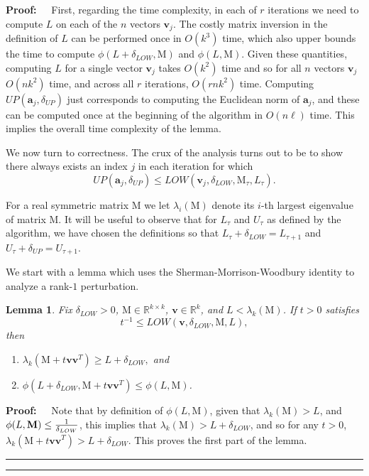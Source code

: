 \documentclass[11pt]{article}
\newtheorem{lemma}[theorem]{Lemma}
\newenvironment{proof}{\begin{trivlist} \item {\bf Proof:~~}}
  {\qed\end{trivlist}}
\newcommand{\mat}[1]{{\ensuremath{\bm{\mathrm{#1}}}}}
\def\ve{{\mathbf v}}
\def\matM{\mat{M}}
\def\frac#1#2{{#1\over #2}}
\def\qed{\hfill\rule{2mm}{2mm}}
\def\a{{\mathbf a}}
\begin{document}
\begin{proof}
First, regarding the time complexity, 
in each of $r$ iterations we need to compute $L$ on each of the $n$ vectors $\ve_j$. The costly matrix
inversion in the definition of $L$ can be performed once in $O(k^3)$ time, which also upper bounds
the time to compute $\phi(L+\delta_{LOW}, \matM)$ and $\phi(L,\matM)$. Given these quantities, 
computing $L$ for a single vector $\ve_j$ takes $O(k^2)$ time and so for all $n$ vectors $\ve_j$
$O(nk^2)$ time, and across all $r$ iterations, $O(rnk^2)$ time. Computing $UP(\a_j, \delta_{UP})$
just corresponds to computing the Euclidean norm of $\a_j$, and these can be computed once at the
beginning of the algorithm in $O(n \ell)$ time. This implies the overall time complexity of the lemma.

We now turn to correctness. The crux of the analysis turns out to be 
to show there always exists an index $j$
in each iteration for which 
$$UP(\a_j, \delta_{UP}) \leq LOW(\ve_j, \delta_{LOW}, \matM_{\tau}, L_{\tau}).$$ 

For a real symmetric matrix $\matM$ we let $\lambda_i(\matM)$ denote 
its $i$-th largest eigenvalue of matrix $\matM$. It will be 
useful to observe that for $L_{\tau}$ and $U_{\tau}$ as defined by the algorithm, we have chosen the
definitions so that $L_{\tau} + \delta_{LOW} = L_{\tau + 1}$ and $U_{\tau} + \delta_{UP} = U_{\tau + 1}$. 

We start with a lemma which uses the 
Sherman-Morrison-Woodbury identity to analyze a rank-$1$ perturbation. 
\begin{lemma}\label{lem:bss}
Fix $\delta_{LOW} > 0$, $\matM \in \mathbb{R}^{k \times k}$, $\ve \in \mathbb{R}^k$, and $L < \lambda_k(\matM)$. If
$t > 0$ satisfies $$t^{-1} \leq LOW(\ve, \delta_{LOW}, \matM, L),$$ 
then 
\begin{enumerate}
\item $\lambda_k(\matM + t\ve\ve^T) \geq L+\delta_{LOW},$ and
\item $\phi(L+\delta_{LOW}, \matM + t\ve\ve^T) \leq \phi(L, \matM)$. 
\end{enumerate} 
\end{lemma}
\begin{proof}
Note that by definition of $\phi(L, \matM)$, given that $\lambda_k(\matM) > L$, 
and $\phi(L, \matM) \leq \frac{1}{\delta_{LOW}}$, this implies that $\lambda_k(\matM) > L + \delta_{LOW}$, and so
for any $t > 0$, $\lambda_k(\matM + t \ve\ve^T) > L + \delta_{LOW}$. This proves the first part of the lemma.


\end{proof}
\end{proof}
\end{document}
